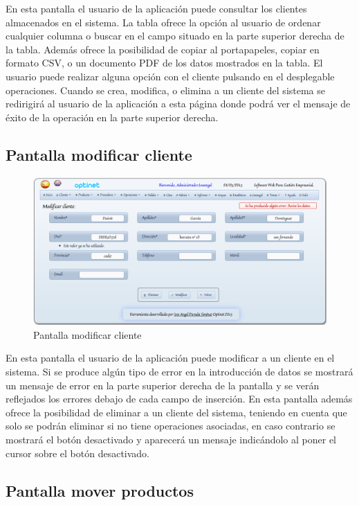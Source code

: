\documentclass[a4paper,11pt]{book}
\begin{document}
En esta pantalla el usuario de la aplicación puede consultar los clientes almacenados en el sistema. La tabla ofrece la opción al usuario de ordenar cualquier columna o buscar en el campo situado en la parte superior derecha de la tabla. Además ofrece la posibilidad de copiar al portapapeles, copiar en formato CSV, o un documento PDF de los datos mostrados en la tabla. El usuario puede realizar alguna opción con el cliente pulsando en el desplegable operaciones. Cuando se crea, modifica, o elimina a un cliente del sistema se redirigirá al usuario de la aplicación a esta página donde podrá ver el mensaje de éxito de la operación en la parte superior derecha.

\newpage
\subsection {Pantalla modificar cliente}

\begin{figure}[!htb]
  \centering
    \includegraphics[scale=0.35]{capmodificarcliente.png}
  \caption{Pantalla modificar cliente}
  \label{a}
\end{figure}

En esta pantalla el usuario de la aplicación puede modificar a un cliente en el sistema. Si se produce algún tipo de error en la introducción de datos se mostrará un mensaje de error en la parte superior derecha de la pantalla y se verán reflejados los errores debajo de cada campo de inserción. En esta pantalla además ofrece la posibilidad de eliminar a un cliente del sistema, teniendo en cuenta que solo se podrán eliminar si no tiene operaciones asociadas, en caso contrario se mostrará el botón desactivado y aparecerá un mensaje indicándolo al poner el cursor sobre el botón desactivado.

\newpage
\subsection {Pantalla mover productos}
\end{document}
